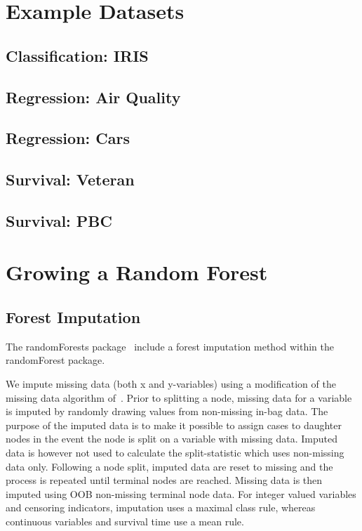 \documentclass[nojss]{jss}\usepackage[]{graphicx}\usepackage[]{color}
\begin{document}
\section{Example Datasets}
\subsection{Classification: IRIS}

\subsection{Regression: Air Quality}

\subsection{Regression: Cars}

\subsection{Survival: Veteran}

\subsection{Survival: PBC}

\section{Growing a Random Forest}

\subsection{Forest Imputation}\label{S:imputation}

The randomForests package~\citep{liaw:2002} include a forest imputation method within the randomForest package. 

We impute missing data (both x and y-variables) using a modification of the missing data algorithm of~\cite{Ishwaran:2008}. Prior to splitting a node, missing data for a variable is imputed by randomly drawing values from non-missing in-bag data. The purpose of the imputed data is to make it possible to assign cases to daughter nodes in the event the node is split on a variable with missing data. Imputed data is however not used to calculate the split-statistic which uses non-missing data only. Following a node split, imputed data are reset to missing and the process is repeated until terminal nodes are reached. Missing data is then imputed using OOB non-missing terminal node data. For integer valued variables and censoring indicators, imputation uses a maximal class rule, whereas continuous variables and survival time use a mean rule.
\end{document}
